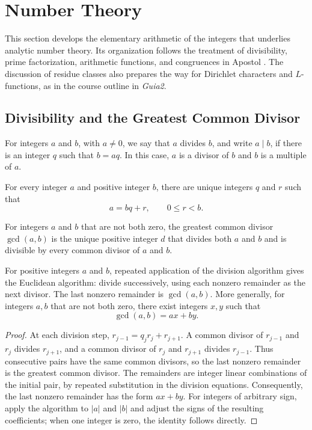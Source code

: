 \section{Number Theory}

This section develops the elementary arithmetic of the integers that underlies analytic number theory. Its organization follows the treatment of divisibility, prime factorization, arithmetic functions, and congruences in Apostol \cite[Chapters 1, 2, and 5]{Apostol1976-xj}. The discussion of residue classes also prepares the way for Dirichlet characters and $L$-functions, as in the course outline in \textit{Guia2}.

\subsection{Divisibility and the Greatest Common Divisor}

\begin{definition}[Divisibility]
For integers $a$ and $b$, with $a\ne 0$, we say that $a$ divides $b$, and write $a\mid b$, if there is an integer $q$ such that $b=aq$. In this case, $a$ is a divisor of $b$ and $b$ is a multiple of $a$.
\end{definition}

\begin{theorem}
For every integer $a$ and positive integer $b$, there are unique integers $q$ and $r$ such that
\[
 a=bq+r,\qquad 0\leq r<b.
\]
\end{theorem}

\begin{definition}
For integers $a$ and $b$ that are not both zero, the greatest common divisor $\gcd(a,b)$ is the unique positive integer $d$ that divides both $a$ and $b$ and is divisible by every common divisor of $a$ and $b$.
\end{definition}

\begin{theorem}
For positive integers $a$ and $b$, repeated application of the division algorithm gives the Euclidean algorithm: divide successively, using each nonzero remainder as the next divisor. The last nonzero remainder is $\gcd(a,b)$. More generally, for integers $a,b$ that are not both zero, there exist integers $x,y$ such that
\[
 \gcd(a,b)=ax+by.
\]
\end{theorem}

\begin{proof}
At each division step, $r_{j-1}=q_jr_j+r_{j+1}$. A common divisor of $r_{j-1}$ and $r_j$ divides $r_{j+1}$, and a common divisor of $r_j$ and $r_{j+1}$ divides $r_{j-1}$. Thus consecutive pairs have the same common divisors, so the last nonzero remainder is the greatest common divisor. The remainders are integer linear combinations of the initial pair, by repeated substitution in the division equations. Consequently, the last nonzero remainder has the form $ax+by$. For integers of arbitrary sign, apply the algorithm to $|a|$ and $|b|$ and adjust the signs of the resulting coefficients; when one integer is zero, the identity follows directly.
\end{proof}

